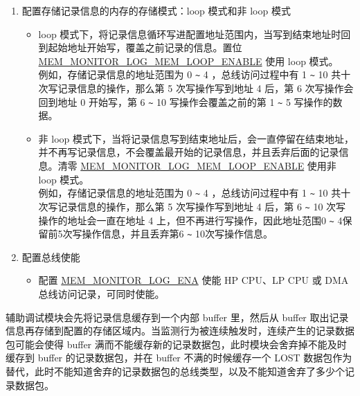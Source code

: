 \documentclass[main\_\_CN.tex]{subfiles}
\begin{document}
\begin{enumerate}
\begin{itemize}
            \item 置位 \hyperref[regdesc:MEMMONITORLOGMEMADDRUPDATEREG]{MEM\_MONITOR\_LOG\_MEM\_ADDR\_UPDATE\_REG}，使 \hyperref[regdesc:MEMMONITORLOGMEMCURRENTADDRREG]{MEM\_MONITOR\_LOG\_MEM\_\\CURRENT\_ADDR\_REG} 更新为 \hyperref[regdesc:MEMMONITORLOGMEMSTARTREG]{MEM\_MONITOR\_LOG\_MEM\_START\_REG}。
            \item 配置辅助调试模块对 HP SRAM 的使用权限，只有开启了辅助调试模块对 HP SRAM 的使用权限才能访问 HP SRAM。关于如何配置，详情见章节 \ref{mod:permctrl} \textit{})。
        \end{itemize}
    \item 配置存储记录信息的内存的存储模式：loop 模式和非 loop 模式
        \begin{itemize}
            \item loop 模式下，将记录信息循环写进配置地址范围内，当写到结束地址时回到起始地址开始写，覆盖之前记录的信息。置位 \hyperref[fielddesc:MEMMONITORLOGMEMLOOPENABLE]{MEM\_MONITOR\_LOG\_MEM\_LOOP\_ENABLE} 使用 loop 模式。\\
            例如，存储记录信息的地址范围为 0 \verb+~+ 4 ，总线访问过程中有 1 \verb+~+ 10 共十次写记录信息的操作，那么第 5 次写操作写到地址 4 后，第 6 次写操作会回到地址 0 开始写，第 6 \verb+~+ 10 写操作会覆盖之前的第 1 \verb+~+ 5 写操作的数据。
            \item 非 loop 模式下，当将记录信息写到结束地址后，会一直停留在结束地址，并不再写记录信息，不会覆盖最开始的记录信息，并且丢弃后面的记录信息。清零 \hyperref[fielddesc:MEMMONITORLOGMEMLOOPENABLE]{MEM\_MONITOR\_LOG\_MEM\_LOOP\_ENABLE} 使用非 loop 模式。\\
            例如，存储记录信息的地址范围为 0 \verb+~+ 4 ，总线访问过程中有 1 \verb+~+ 10 共十次写记录信息的操作，那么第 5 次写操作写到地址 4 后，第 6 \verb+~+ 10 次写操作的地址会一直在地址 4 上，但不再进行写操作，因此地址范围0 \verb+~+ 4保留前5次写操作信息，并且丢弃第6 \verb+~+ 10次写操作信息。
        \end{itemize}
     \item 配置总线使能
        \begin{itemize}
            \item 配置 \hyperref[fielddesc:MEMMONITORLOGENA]{MEM\_MONITOR\_LOG\_ENA} 使能 HP CPU、LP CPU 或 DMA 总线访问记录，可同时使能。
        \end{itemize}
\end{enumerate}

辅助调试模块会先将记录信息缓存到一个内部 buffer 里，然后从 buffer 取出记录信息再存储到配置的存储区域内。当监测行为被连续触发时，连续产生的记录数据包可能会使得 buffer 满而不能缓存新的记录数据包，此时模块会舍弃掉不能及时缓存到 buffer 的记录数据包，并在 buffer 不满的时候缓存一个 LOST 数据包作为替代，此时不能知道舍弃的记录数据包的总线类型，以及不能知道舍弃了多少个记录数据包。
\end{document}
